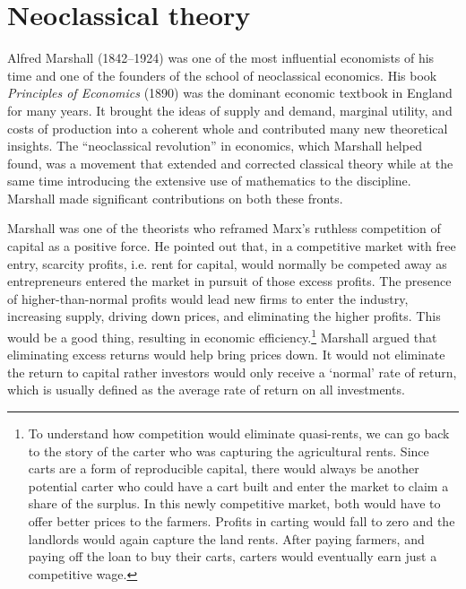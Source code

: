 
\section{Neoclassical theory }

Alfred Marshall (1842--1924) was one of the most influential economists of his time and one of the founders of the school of neoclassical economics. His book \textit{Principles of Economics} (1890) \cite{marshallPrinciplesEconomics1890} was the dominant economic textbook in England for many years. It brought the ideas of supply and demand, marginal utility, and costs of production into a coherent whole and contributed many new theoretical insights. 
The ``neoclassical revolution'' in economics, which Marshall helped found, was a movement that extended and corrected classical theory while at the same time introducing the extensive use of mathematics to the discipline. Marshall made significant contributions on both these fronts. 

Marshall was one of the theorists who reframed Marx's ruthless competition of capital as a positive force.  
He pointed out that, in a competitive market with \gls{free entry}, {scarcity profits}, i.e. rent for capital, would normally be competed away as entrepreneurs entered the market in pursuit of those \gls{excess profits}. The presence of higher-than-normal profits would lead new firms to enter the industry, increasing supply, driving down prices, and eliminating the higher profits.  This would be a good thing, resulting in economic efficiency.\footnote{To understand how competition would eliminate quasi-rents, we can go back to the story of the carter who was capturing the agricultural rents. Since carts are a form of reproducible capital, there would always be another potential carter who could have a cart built and enter the market to claim a share of the surplus. In this newly competitive market, both would have to offer better prices to the farmers. Profits in carting would fall to zero and the landlords would again capture the land rents. After paying farmers, and paying off the loan to buy their carts, carters would eventually earn just a competitive wage.} Marshall argued that eliminating  excess returns would help bring prices down. It would not eliminate the return to capital rather investors would only receive a `normal'  rate of return, which is usually defined as the average rate of return on all investments.

